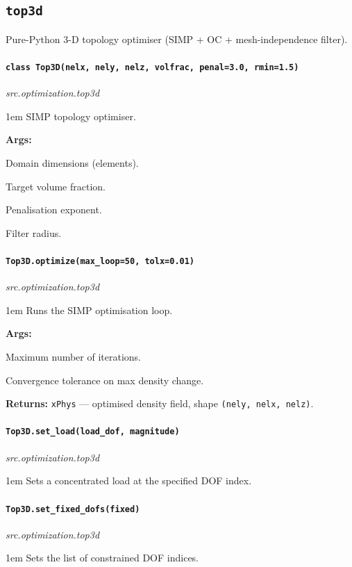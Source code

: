 \documentclass[a4paper, 11pt, openany]{report}
\newcommand{\apifunc}[2]{%
    \paragraph{\texttt{#2}}\hfill\textit{\small #1}\par\nopagebreak
}
\begin{document}
\subsection{\texttt{top3d}}

Pure-Python 3-D topology optimiser (SIMP + OC + mesh-independence filter).

\apifunc{src.optimization.top3d}{class Top3D(nelx, nely, nelz, volfrac, penal=3.0, rmin=1.5)}
\begin{adjustwidth}{1em}{}
SIMP topology optimiser.

\textbf{Args:}
\begin{description}[nosep, labelwidth=2.5cm, leftmargin=3cm]
    \item[\texttt{nelx, nely, nelz}] Domain dimensions (elements).
    \item[\texttt{volfrac}] Target volume fraction.
    \item[\texttt{penal}] Penalisation exponent.
    \item[\texttt{rmin}] Filter radius.
\end{description}
\end{adjustwidth}

\apifunc{src.optimization.top3d}{Top3D.optimize(max\_loop=50, tolx=0.01)}
\begin{adjustwidth}{1em}{}
Runs the SIMP optimisation loop.

\textbf{Args:}
\begin{description}[nosep, labelwidth=2.5cm, leftmargin=3cm]
    \item[\texttt{max\_loop}] Maximum number of iterations.
    \item[\texttt{tolx}] Convergence tolerance on max density change.
\end{description}

\textbf{Returns:} \texttt{xPhys} --- optimised density field, shape
\texttt{(nely, nelx, nelz)}.
\end{adjustwidth}

\apifunc{src.optimization.top3d}{Top3D.set\_load(load\_dof, magnitude)}
\begin{adjustwidth}{1em}{}
Sets a concentrated load at the specified DOF index.
\end{adjustwidth}

\apifunc{src.optimization.top3d}{Top3D.set\_fixed\_dofs(fixed)}
\begin{adjustwidth}{1em}{}
Sets the list of constrained DOF indices.
\end{adjustwidth}
\end{document}
